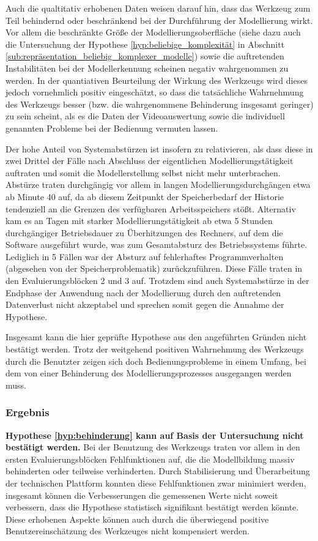 Auch die qualtitativ erhobenen Daten weisen darauf hin, dass das Werkzeug zum Teil behindernd oder beschränkend bei der Durchführung der Modellierung wirkt. Vor allem die beschränkte Größe der Modellierungsoberfläche (siehe dazu auch die Untersuchung der Hypothese \ref{hyp:beliebige_komplexität} in Abschnitt \ref{sub:repräsentation_beliebig_komplexer_modelle}) sowie die auftretenden Instabilitäten bei der Modellerkennung scheinen negativ wahrgenommen zu werden. In der quantiativen Beurteilung der Wirkung des Werkzeugs wird dieses jedoch vornehmlich positiv eingeschätzt, so dass die tatsächliche Wahrnehmung des Werkzeugs besser (bzw. die wahrgenommene Behinderung insgesamt geringer) zu sein scheint, als es die Daten der Videoauswertung sowie die individuell genannten Probleme bei der Bedienung vermuten lassen.

Der hohe Anteil von Systemabstürzen ist insofern zu relativieren, als dass diese in zwei Drittel der Fälle nach Abschluss der eigentlichen Modellierungstätigkeit auftraten und somit die Modellerstellung selbst nicht mehr unterbrachen. Abstürze traten durchgängig vor allem in langen Modellierungsdurchgängen etwa ab Minute 40 auf, da ab diesem Zeitpunkt der Speicherbedarf der Historie tendenziell an die Grenzen des verfügbaren Arbeitsspeichers stößt. Alternativ kam es an Tagen mit starker Modellierungstätigkeit ab etwa 5 Stunden durchgängiger Betriebsdauer zu Überhitzungen des Rechners, auf dem die Software ausgeführt wurde, was zum Gesamtabsturz des Betriebssystems führte. Lediglich in 5 Fällen war der Absturz auf fehlerhaftes Programmverhalten (abgesehen von der Speicherproblematik) zurückzuführen. Diese Fälle traten in den Evaluierungsblöcken 2 und 3 auf. Trotzdem sind auch Systemabstürze in der Endphase der Anwendung nach der Modellierung durch den auftretenden Datenverlust nicht akzeptabel und sprechen somit gegen die Annahme der Hypothese.

Insgesamt kann die hier geprüfte Hypothese aus den angeführten Gründen nicht bestätigt werden. Trotz der weitgehend positiven Wahrnehmung des Werkzeugs durch die Benutzter zeigen sich doch Bedienungsprobleme in einem Umfang, bei dem von einer Behinderung des Modellierungsprozesses ausgegangen werden muss.

\subsubsection{Ergebnis} 

\textbf{Hypothese \ref{hyp:behinderung} kann auf Basis der Untersuchung nicht bestätigt werden.} Bei der Benutzung des Werkzeugs traten vor allem in den ersten Evaluierungsblöcken Fehlfunktionen auf, die die Modellbildung massiv behinderten oder teilweise verhinderten. Durch Stabilisierung und Überarbeitung der technischen Plattform konnten diese Fehlfunktionen zwar minimiert werden, insgesamt können die Verbesserungen die gemessenen Werte nicht soweit verbessern, dass die Hypothese statistisch signifikant bestätigt werden könnte. Diese erhobenen Aspekte können auch durch die überwiegend positive Benutzereinschätzung des Werkzeuges nicht kompensiert werden.

